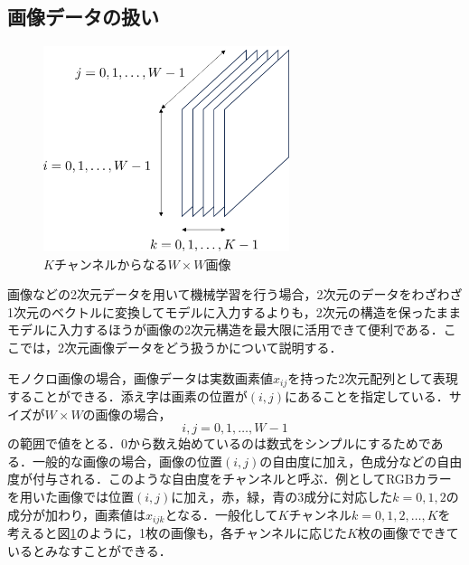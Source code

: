 \documentclass[a4paper,11pt]{jsreport}
\begin{document}
\subsection{画像データの扱い}
\begin{figure}[H]
  \begin{center}
      \includegraphics[height=6cm]{image/Kチャンネル画像.png}
      \caption{$K$チャンネルからなる$W \times W$画像}
      \label{Kチャンネル画像}
  \end{center}
\end{figure}
画像などの2次元データを用いて機械学習を行う場合，2次元のデータをわざわざ1次元のベクトルに変換してモデルに入力するよりも，2次元の構造を保ったままモデルに入力するほうが画像の2次元構造を最大限に活用できて便利である．ここでは，2次元画像データをどう扱うかについて説明する．\par
モノクロ画像の場合，画像データは実数画素値$x_{ij}$を持った2次元配列として表現することができる．添え字は画素の位置が$(i,j)$にあることを指定している．サイズが$W \times W$の画像の場合，
\begin{equation}
  i,j = 0,1,\dots,W-1
\end{equation}
の範囲で値をとる．0から数え始めているのは数式をシンプルにするためである．一般的な画像の場合，画像の位置$(i,j)$の自由度に加え，色成分などの自由度が付与される．このような自由度をチャンネルと呼ぶ．例としてRGBカラーを用いた画像では位置$(i,j)$に加え，赤，緑，青の3成分に対応した$k=0,1,2$の成分が加わり，画素値は$x_{ijk}$となる．一般化して$K$チャンネル$k=0,1,2,\dots,K$を考えると図\ref{Kチャンネル画像}のように，1枚の画像も，各チャンネルに応じた$K$枚の画像でできているとみなすことができる．
\end{document}
